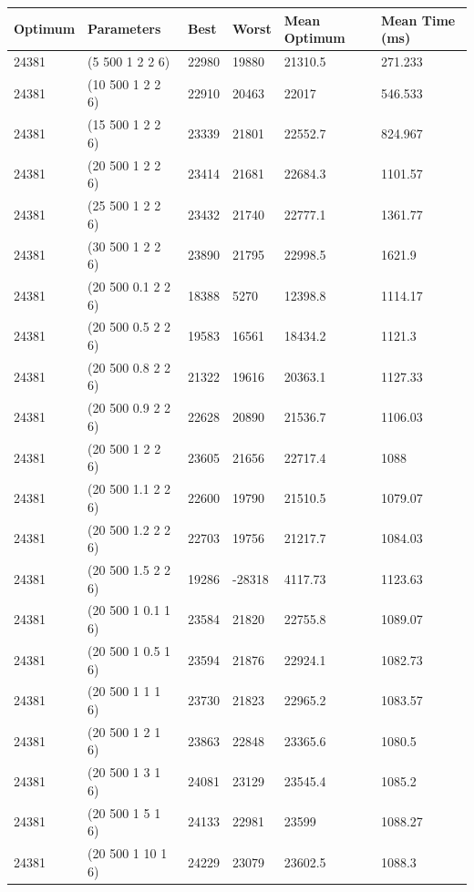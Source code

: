 \documentclass{article}
\begin{document}
\begin{table}
\begin{tabular}{|l|l|l|l|l|l|}
	\hline
	Optimum & Parameters & Best & Worst & Mean Optimum & Mean Time (ms) \\ \hline
	24381 & (5 500 1 2 2 6) & 22980 & 19880 & 21310.5 & 271.233 \\ \hline
	24381 & (10 500 1 2 2 6) & 22910 & 20463 & 22017 & 546.533 \\ \hline
	24381 & (15 500 1 2 2 6) & 23339 & 21801 & 22552.7 & 824.967 \\ \hline
	24381 & (20 500 1 2 2 6) & 23414 & 21681 & 22684.3 & 1101.57 \\ \hline
	24381 & (25 500 1 2 2 6) & 23432 & 21740 & 22777.1 & 1361.77 \\ \hline
	24381 & (30 500 1 2 2 6) & 23890 & 21795 & 22998.5 & 1621.9 \\ \hline
	24381 & (20 500 0.1 2 2 6) & 18388 & 5270 & 12398.8 & 1114.17 \\ \hline
	24381 & (20 500 0.5 2 2 6) & 19583 & 16561 & 18434.2 & 1121.3 \\ \hline
	24381 & (20 500 0.8 2 2 6) & 21322 & 19616 & 20363.1 & 1127.33 \\ \hline
	24381 & (20 500 0.9 2 2 6) & 22628 & 20890 & 21536.7 & 1106.03 \\ \hline
	24381 & (20 500 1 2 2 6) & 23605 & 21656 & 22717.4 & 1088 \\ \hline
	24381 & (20 500 1.1 2 2 6) & 22600 & 19790 & 21510.5 & 1079.07 \\ \hline
	24381 & (20 500 1.2 2 2 6) & 22703 & 19756 & 21217.7 & 1084.03 \\ \hline
	24381 & (20 500 1.5 2 2 6) & 19286 & -28318 & 4117.73 & 1123.63 \\ \hline
	24381 & (20 500 1 0.1 1 6) & 23584 & 21820 & 22755.8 & 1089.07 \\ \hline
	24381 & (20 500 1 0.5 1 6) & 23594 & 21876 & 22924.1 & 1082.73 \\ \hline
	24381 & (20 500 1 1 1 6) & 23730 & 21823 & 22965.2 & 1083.57 \\ \hline
	24381 & (20 500 1 2 1 6) & 23863 & 22848 & 23365.6 & 1080.5 \\ \hline
	24381 & (20 500 1 3 1 6) & 24081 & 23129 & 23545.4 & 1085.2 \\ \hline
	24381 & (20 500 1 5 1 6) & 24133 & 22981 & 23599 & 1088.27 \\ \hline
	24381 & (20 500 1 10 1 6) & 24229 & 23079 & 23602.5 & 1088.3 \\ \hline

\end{tabular}
\end{table}
\end{document}
